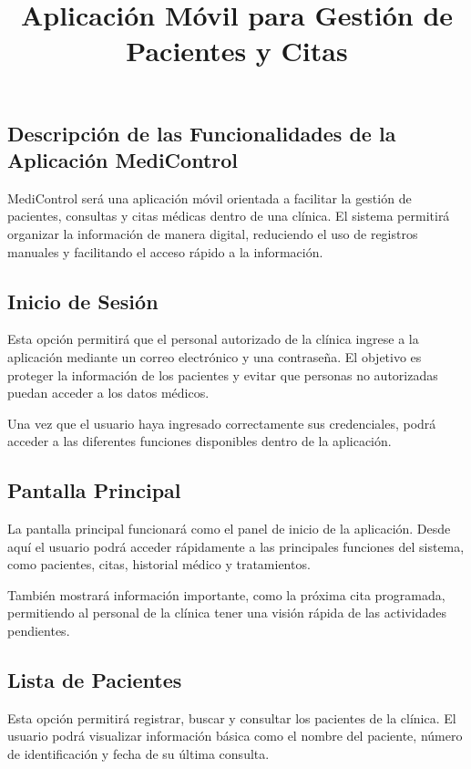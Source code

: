 \documentclass[stu,letterpaper,floatsintext,nolmodern,nofontenc]{apa7}
\title{Aplicación Móvil para Gestión de Pacientes y Citas}
\begin{document}
\maketitle

\subsection{Descripción de las Funcionalidades de la Aplicación MediControl}

MediControl será una aplicación móvil orientada a facilitar la gestión de pacientes, consultas y citas médicas dentro de una clínica. El sistema permitirá organizar la información de manera digital, reduciendo el uso de registros manuales y facilitando el acceso rápido a la información.

\subsection{Inicio de Sesión}

Esta opción permitirá que el personal autorizado de la clínica ingrese a la aplicación mediante un correo electrónico y una contraseña. El objetivo es proteger la información de los pacientes y evitar que personas no autorizadas puedan acceder a los datos médicos.

Una vez que el usuario haya ingresado correctamente sus credenciales, podrá acceder a las diferentes funciones disponibles dentro de la aplicación.

\subsection{Pantalla Principal}

La pantalla principal funcionará como el panel de inicio de la aplicación. Desde aquí el usuario podrá acceder rápidamente a las principales funciones del sistema, como pacientes, citas, historial médico y tratamientos.

También mostrará información importante, como la próxima cita programada, permitiendo al personal de la clínica tener una visión rápida de las actividades pendientes.

\subsection{Lista de Pacientes}

Esta opción permitirá registrar, buscar y consultar los pacientes de la clínica. El usuario podrá visualizar información básica como el nombre del paciente, número de identificación y fecha de su última consulta.
\end{document}
